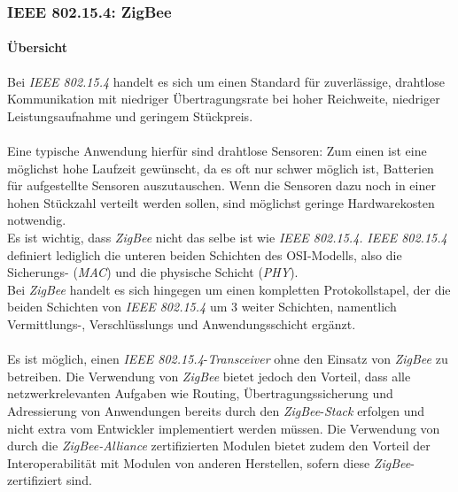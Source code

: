         \subsubsection{IEEE 802.15.4: ZigBee}

            \paragraph{Übersicht}
                Bei \emph{IEEE 802.15.4} handelt es sich um einen Standard für 
                zuverlässige, drahtlose Kommunikation mit niedriger Übertragungsrate
                bei hoher Reichweite, niedriger Leistungsaufnahme und geringem Stückpreis.\\
                \\
                Eine typische Anwendung hierfür sind drahtlose Sensoren: Zum einen
                ist eine möglichst hohe Laufzeit gewünscht, da es oft nur schwer
                möglich ist, Batterien für aufgestellte Sensoren auszutauschen.
                Wenn die Sensoren dazu noch in einer hohen Stückzahl verteilt werden
                sollen, sind möglichst geringe Hardwarekosten notwendig.
                \\
                Es ist wichtig, dass \emph{ZigBee} nicht das selbe ist wie \emph{IEEE 802.15.4.}
                \emph{IEEE 802.15.4} definiert lediglich die unteren beiden Schichten des
                OSI-Modells, also die Sicherungs- (\emph{MAC}) und die physische Schicht 
                (\emph{PHY}).\\
                Bei \emph{ZigBee} handelt es sich hingegen um einen kompletten Protokollstapel,
                der die beiden Schichten von \emph{IEEE 802.15.4} um 3 weiter Schichten,
                namentlich Vermittlungs-, Verschlüsslungs und Anwendungsschicht 
                ergänzt.  \\
                \\
                Es ist möglich, einen \emph{IEEE 802.15.4}-\emph{Transceiver} ohne den Einsatz
                von \emph{ZigBee} zu betreiben. Die Verwendung von \emph{ZigBee} bietet jedoch
                den Vorteil, dass alle netzwerkrelevanten Aufgaben wie Routing,
                Übertragungssicherung und Adressierung von Anwendungen bereits
                durch den \emph{ZigBee}-\emph{Stack} erfolgen und nicht extra vom Entwickler
                implementiert werden müssen. Die Verwendung von durch die
                \emph{ZigBee-Alliance} zertifizierten Modulen bietet zudem den
                Vorteil der Interoperabilität mit Modulen von anderen Herstellen,
                sofern diese \emph{ZigBee}-zertifiziert sind.

